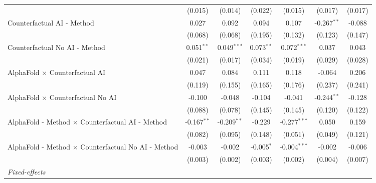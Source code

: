 \begin{tabular}{lcccccc}
                                                              & (0.015)       & (0.014)       & (0.022)      & (0.015)        & (0.017)       & (0.017)\\   
   Counterfactual AI - Method                                 & 0.027         & 0.092         & 0.094        & 0.107          & -0.267$^{**}$ & -0.088\\   
                                                              & (0.068)       & (0.068)       & (0.195)      & (0.132)        & (0.123)       & (0.147)\\   
   Counterfactual No AI - Method                              & 0.051$^{**}$  & 0.049$^{***}$ & 0.073$^{**}$ & 0.072$^{***}$  & 0.037         & 0.043\\   
                                                              & (0.021)       & (0.017)       & (0.034)      & (0.019)        & (0.029)       & (0.028)\\   
   AlphaFold $\times$ Counterfactual AI                       & 0.047         & 0.084         & 0.111        & 0.118          & -0.064        & 0.206\\   
                                                              & (0.119)       & (0.155)       & (0.165)      & (0.176)        & (0.237)       & (0.241)\\   
   AlphaFold $\times$ Counterfactual No AI                    & -0.100        & -0.048        & -0.104       & -0.041         & -0.244$^{**}$ & -0.128\\   
                                                              & (0.088)       & (0.078)       & (0.145)      & (0.145)        & (0.120)       & (0.122)\\   
   AlphaFold - Method $\times$ Counterfactual AI - Method     & -0.167$^{**}$ & -0.209$^{**}$ & -0.229       & -0.277$^{***}$ & 0.050         & 0.159\\   
                                                              & (0.082)       & (0.095)       & (0.148)      & (0.051)        & (0.049)       & (0.121)\\   
   AlphaFold - Method $\times$ Counterfactual No AI - Method  & -0.003        & -0.002        & -0.005$^{*}$ & -0.004$^{***}$ & -0.002        & -0.006\\   
                                                              & (0.003)       & (0.002)       & (0.003)      & (0.002)        & (0.004)       & (0.007)\\   
   \midrule
   \emph{Fixed-effects}\\

\end{tabular}
